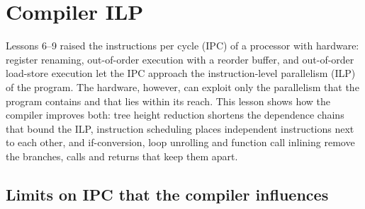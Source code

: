 \documentclass[../main.tex]{subfiles}
\begin{document}
\chapter{Compiler ILP}

Lessons 6--9 raised the instructions per cycle (IPC) of a processor with
hardware: register renaming, out-of-order execution with a reorder buffer, and
out-of-order load-store execution let the IPC approach the instruction-level
parallelism (ILP) of the program.  The hardware, however, can exploit only the
parallelism that the program contains and that lies within its reach.  This
lesson shows how the compiler improves both: tree height reduction shortens
the dependence chains that bound the ILP, instruction scheduling places
independent instructions next to each other, and if-conversion, loop unrolling
and function call inlining remove the branches, calls and returns that keep
them apart.

\section{Limits on IPC that the compiler influences}
\label{sec:l10-limits}
\end{document}
